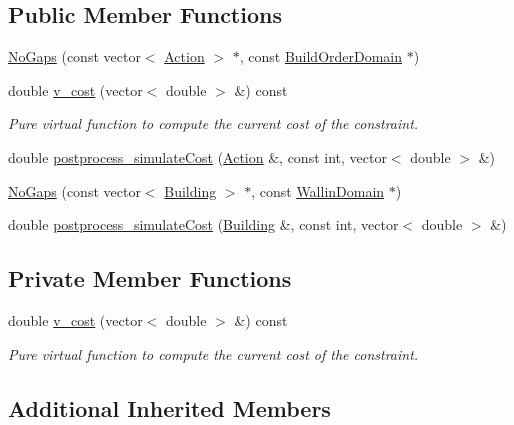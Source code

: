\subsection*{Public Member Functions}
\begin{DoxyCompactItemize}
\item 
\hyperlink{classghost_1_1NoGaps_a7c3840344616681499ee350de3a33819}{No\-Gaps} (const vector$<$ \hyperlink{classghost_1_1Action}{Action} $>$ $\ast$, const \hyperlink{classghost_1_1BuildOrderDomain}{Build\-Order\-Domain} $\ast$)
\item 
double \hyperlink{classghost_1_1NoGaps_a3fa23de6946e443f009ecb5054a96572}{v\-\_\-cost} (vector$<$ double $>$ \&) const 
\begin{DoxyCompactList}\small\item\em Pure virtual function to compute the current cost of the constraint. \end{DoxyCompactList}\item 
double \hyperlink{classghost_1_1NoGaps_a7c2d73c135cf5c628b19b37f81fe0275}{postprocess\-\_\-simulate\-Cost} (\hyperlink{classghost_1_1Action}{Action} \&, const int, vector$<$ double $>$ \&)
\item 
\hyperlink{classghost_1_1NoGaps_a3f3cbd41ad60c54f6030dd5203a25610}{No\-Gaps} (const vector$<$ \hyperlink{classghost_1_1Building}{Building} $>$ $\ast$, const \hyperlink{classghost_1_1WallinDomain}{Wallin\-Domain} $\ast$)
\item 
double \hyperlink{classghost_1_1NoGaps_a65b1ce5aa567ad8c67b184cec8f320ac}{postprocess\-\_\-simulate\-Cost} (\hyperlink{classghost_1_1Building}{Building} \&, const int, vector$<$ double $>$ \&)
\end{DoxyCompactItemize}
\subsection*{Private Member Functions}
\begin{DoxyCompactItemize}
\item 
double \hyperlink{classghost_1_1NoGaps_a3fa23de6946e443f009ecb5054a96572}{v\-\_\-cost} (vector$<$ double $>$ \&) const 
\begin{DoxyCompactList}\small\item\em Pure virtual function to compute the current cost of the constraint. \end{DoxyCompactList}\end{DoxyCompactItemize}
\subsection*{Additional Inherited Members}


